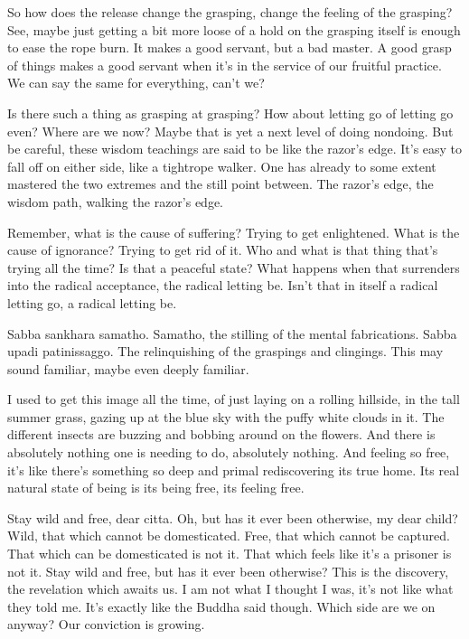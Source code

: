 \documentclass[12pt,openany]{book}
\begin{document}
So how does the release change the grasping, change the feeling of the grasping? See, maybe just getting a bit more loose of a hold on the grasping itself is enough to ease the rope burn. It makes a good servant, but a bad master. A good grasp of things makes a good servant when it's in the service of our fruitful practice. We can say the same for everything, can't we?

Is there such a thing as grasping at grasping? How about letting go of letting go even? Where are we now? Maybe that is yet a next level of doing nondoing. But be careful, these wisdom teachings are said to be like the razor's edge. It's easy to fall off on either side, like a tightrope walker. One has already to some extent mastered the two extremes and the still point between. The razor's edge, the wisdom path, walking the razor's edge. 

Remember, what is the cause of suffering? Trying to get enlightened. What is the cause of ignorance? Trying to get rid of it. Who and what is that thing that's trying all the time? Is that a peaceful state? What happens when that surrenders into the radical acceptance, the radical letting be. Isn't that in itself a radical letting go, a radical letting be.

Sabba sankhara samatho. Samatho, the stilling of the mental fabrications. Sabba upadi patinissaggo. The relinquishing of the graspings and clingings. This may sound familiar, maybe even deeply familiar.

I used to get this image all the time, of just laying on a rolling hillside, in the tall summer grass, gazing up at the blue sky with the puffy white clouds in it. The different insects are buzzing and bobbing around on the flowers. And there is absolutely nothing one is needing to do, absolutely nothing. And feeling so free, it's like there's something so deep and primal rediscovering its true home. Its real natural state of being is its being free, its feeling free.

Stay wild and free, dear citta. Oh, but has it ever been otherwise, my dear child? Wild, that which cannot be domesticated. Free, that which cannot be captured. That which can be domesticated is not it. That which feels like it's a prisoner is not it. Stay wild and free, but has it ever been otherwise? This is the discovery, the revelation which awaits us. I am not what I thought I was, it's not like what they told me. It's exactly like the Buddha said though. Which side are we on anyway? Our conviction is growing.
\end{document}
